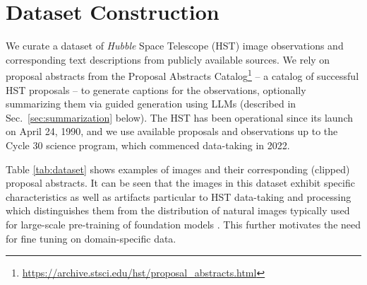 \documentclass[10pt]{article} %
\newcommand{\hubble}{\emph{Hubble}\xspace}
\begin{document}
\section{Dataset Construction}
\label{sec:dataset}

We curate a dataset of \hubble Space Telescope (HST) image observations and corresponding text descriptions from publicly available sources.
%
We rely on proposal abstracts from the Proposal Abstracts Catalog\footnote{\url{https://archive.stsci.edu/hst/proposal_abstracts.html}} -- a catalog of successful HST proposals -- to generate captions for the observations, optionally summarizing them via guided generation using LLMs (described in Sec.~\ref{sec:summarization} below).
%
The HST has been operational since its launch on April 24, 1990, and we use available proposals and observations up to the Cycle 30 science program, which commenced data-taking in 2022.
%

Table \ref{tab:dataset} shows examples of images and their corresponding (clipped) proposal abstracts.
%
It can be seen that the images in this dataset exhibit specific characteristics as well as artifacts particular to HST data-taking and processing which distinguishes them from the distribution of natural images typically used for large-scale pre-training of foundation models \citep{deng2009imagenet}.
%
This further motivates the need for fine tuning on domain-specific data.




\end{document}
